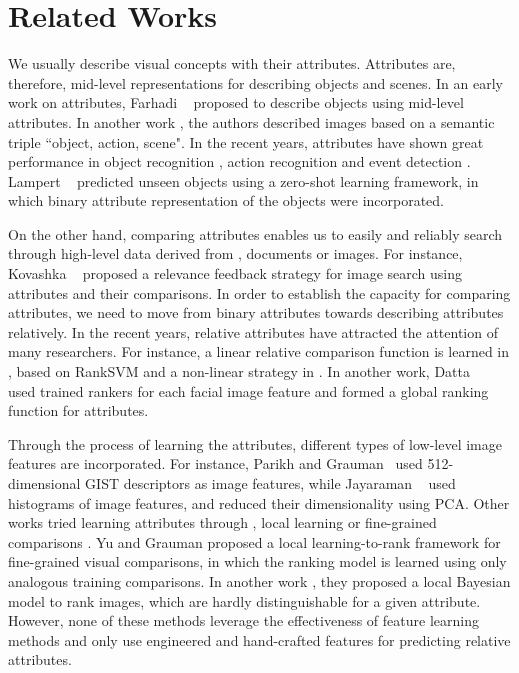 

\section{Related Works}
\label{sec.2}

We usually describe visual concepts with their attributes. %
Attributes are, therefore, mid-level representations for describing objects and scenes. In an early work on attributes, Farhadi \etal~\cite{Farhadi09describingobjects} proposed to describe objects using mid-level attributes. In another work \cite{farhadi10}, the authors described images based on %
a semantic triple ``object, action, scene". In the recent years, attributes have shown great performance in object recognition \cite{Farhadi09describingobjects,7298613}, action recognition \cite{6838985,5995353} and event detection \cite{6475038}. Lampert \etal~\cite{6571196} predicted unseen objects using a zero-shot learning framework, in which binary attribute representation of the objects were incorporated. 

On the other hand, comparing attributes enables us to easily and reliably search through high-level data derived from \eg, documents or images. For instance, Kovashka \etal~\cite{KovashkaG13} proposed a relevance feedback strategy for image search using attributes and their comparisons. In order to establish the capacity for comparing attributes, we need to move from binary attributes towards describing attributes relatively. In the recent years, relative attributes have attracted the attention of many researchers.
For instance, a linear relative comparison function is learned in \cite{parikh2011}, based on RankSVM \cite{Joachims2002} and a non-linear strategy in \cite{Li2013}. In another work, Datta \etal~\cite{5771429} used trained rankers for each facial image feature and formed a global ranking function for attributes.

Through the process of learning the attributes, different types of low-level image features are incorporated. For instance, Parikh and Grauman~\cite{parikh2011} used 512-dimensional GIST \cite{Aude01} descriptors as image features, while Jayaraman \etal~\cite{6909607} used histograms of image features, and reduced their dimensionality using PCA. Other works tried learning attributes through \eg, local learning \cite{1641014} or fine-grained comparisons \cite{Yu2014}. Yu and Grauman \cite{Yu2014} proposed a local learning-to-rank framework for fine-grained visual comparisons, in which the ranking model is learned using only analogous training comparisons. In another work \cite{Yu2015}, they proposed a local Bayesian model to rank images, which are hardly distinguishable for a given attribute. However, none of these methods leverage the effectiveness of feature learning methods and only use engineered and hand-crafted features for predicting relative attributes. %


